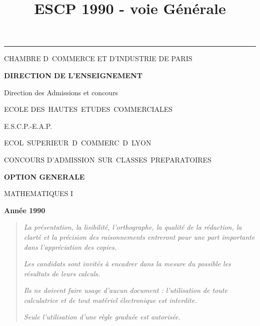 \documentclass[11pt]{article}%
\title{\bf \vspace{-2cm} ESCP 1990 - voie Générale} %
\author{} %
\date{} %
\begin{document}
\maketitle %
\vspace{-1.4cm}\hrule %
\thispagestyle{fancy}

\vspace*{.2cm}




\begin{center}
{\small CHAMBRE D\E\ COMMERCE ET D'INDUSTRIE DE PARIS}

\textbf{DIRECTION DE L'ENSEIGNEMENT}

Direction des Admissions et concours

\underline{\hspace*{3cm}}

{\Large ECOLE DES\ HAUTES\ ETUDES\ COMMERCIALES}

{\Large E.S.C.P.-E.A.P.}

{\Large ECOL\E\ SUPERIEUR\E\ D\E\ COMMERC\E\ D\E\ LYON}{\large }

CONCOURS D'ADMISSION\ SUR\ CLASSES\ PREPARATOIRES

\underline{\hspace*{3cm}}

\textbf{OPTION GENERALE}

{\Large MATHEMATIQUES I}

\textbf{Année 1990}

\underline{\hspace*{3cm}}
\end{center}

\begin{quotation}
\noindent \textsl{La présentation, la lisibilité, l'orthographe, la
qualité
de la rédaction, la clarté et la précision des raisonnements entreront
pour
une part importante dans l'appréciation des copies.}

\noindent \textsl{Les candidats sont invités à encadrer dans la mesure
du
possible les résultats de leurs calculs.}

\noindent \textsl{Ils ne doivent faire usage d'aucun document :
l'utilisation de toute calculatrice et de tout matériel électronique
est
interdite.}

\noindent \textsl{Seule l'utilisation d'une règle graduée est
autorisée.}

\noindent \textsl{\hrulefill }
\end{quotation}
\end{document}

